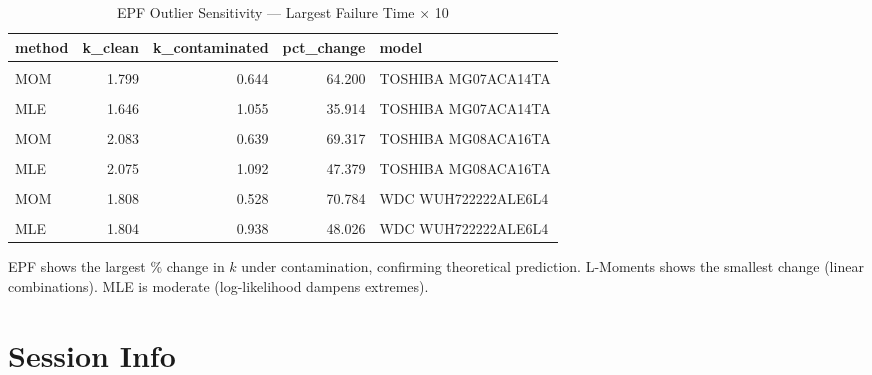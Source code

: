 \documentclass[
]{article}
\begin{document}
\begin{longtable}[t]{lrrrl}
\caption{\label{tab:sensitivity}EPF Outlier Sensitivity — Largest Failure Time × 10}\\
\toprule
method & k\_clean & k\_contaminated & pct\_change & model\\
\midrule
\cellcolor{gray!10}{EPF} & \cellcolor{gray!10}{1.921} & \cellcolor{gray!10}{0.566} & \cellcolor{gray!10}{70.549} & \cellcolor{gray!10}{TOSHIBA MG07ACA14TA}\\
MOM & 1.799 & 0.644 & 64.200 & TOSHIBA MG07ACA14TA\\
\cellcolor{gray!10}{L-Moments} & \cellcolor{gray!10}{1.719} & \cellcolor{gray!10}{1.265} & \cellcolor{gray!10}{26.452} & \cellcolor{gray!10}{TOSHIBA MG07ACA14TA}\\
MLE & 1.646 & 1.055 & 35.914 & TOSHIBA MG07ACA14TA\\
\cellcolor{gray!10}{EPF} & \cellcolor{gray!10}{2.202} & \cellcolor{gray!10}{0.574} & \cellcolor{gray!10}{73.933} & \cellcolor{gray!10}{TOSHIBA MG08ACA16TA}\\
\addlinespace
MOM & 2.083 & 0.639 & 69.317 & TOSHIBA MG08ACA16TA\\
\cellcolor{gray!10}{L-Moments} & \cellcolor{gray!10}{2.013} & \cellcolor{gray!10}{1.329} & \cellcolor{gray!10}{33.986} & \cellcolor{gray!10}{TOSHIBA MG08ACA16TA}\\
MLE & 2.075 & 1.092 & 47.379 & TOSHIBA MG08ACA16TA\\
\cellcolor{gray!10}{EPF} & \cellcolor{gray!10}{1.879} & \cellcolor{gray!10}{0.524} & \cellcolor{gray!10}{72.114} & \cellcolor{gray!10}{WDC WUH722222ALE6L4}\\
MOM & 1.808 & 0.528 & 70.784 & WDC WUH722222ALE6L4\\
\addlinespace
\cellcolor{gray!10}{L-Moments} & \cellcolor{gray!10}{1.747} & \cellcolor{gray!10}{0.971} & \cellcolor{gray!10}{44.413} & \cellcolor{gray!10}{WDC WUH722222ALE6L4}\\
MLE & 1.804 & 0.938 & 48.026 & WDC WUH722222ALE6L4\\
\bottomrule
\end{longtable}

EPF shows the largest \% change in \(k\) under contamination, confirming
theoretical prediction. L-Moments shows the smallest change (linear
combinations). MLE is moderate (log-likelihood dampens extremes).

\newpage

\section{Session Info}\label{session-info}
\end{document}
